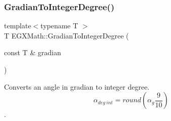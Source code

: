 \mbox{\label{group___e_g_x_math-_angle_conversions-_gradian_ga555aae885f8a7d0876a36aa07cbbd816}} 
\subsubsection{\texorpdfstring{Gradian\+To\+Integer\+Degree()}{GradianToIntegerDegree()}}
{\footnotesize\ttfamily template$<$typename T $>$ \\
T E\+G\+X\+Math\+::\+Gradian\+To\+Integer\+Degree (\begin{DoxyParamCaption}\item[{const T \&}]{gradian }\end{DoxyParamCaption})}



Converts an angle in gradian to integer degree. \[\alpha_{deg\ int}=round(\alpha_{g}\frac{9}{10})\]. 

